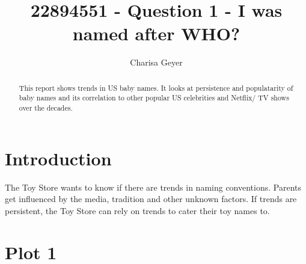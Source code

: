 \documentclass[11pt,preprint]{elsarticle}
\numberwithin{equation}{section}
\numberwithin{figure}{section}
\numberwithin{table}{section}
\begin{document}
\begin{frontmatter}  %

\title{22894551 - Question 1 - I was named after WHO?}





\author[Add1]{Charisa Geyer}





\address[Add1]{Stellenbosch University, Cape Town, South Africa}


\begin{abstract}
\small{
This report shows trends in US baby names. It looks at persistence and
populatarity of baby names and its correlation to other popular US
celebrities and Netflix/ TV shows over the decades.
}
\end{abstract}

\vspace{1cm}





\vspace{0.5cm}

\end{frontmatter}

\setcounter{footnote}{0}



\pagestyle{fancy}
\chead{}
\rhead{}
\lfoot{}
\lhead{}
\cfoot{}


\headsep 35pt %




\section{\texorpdfstring{Introduction
\label{Introduction}}{Introduction }}\label{introduction}

The Toy Store wants to know if there are trends in naming conventions.
Parents get influenced by the media, tradition and other unknown
factors. If trends are persistent, the Toy Store can rely on trends to
cater their toy names to.

\section{Plot 1}\label{plot-1}
\end{document}

